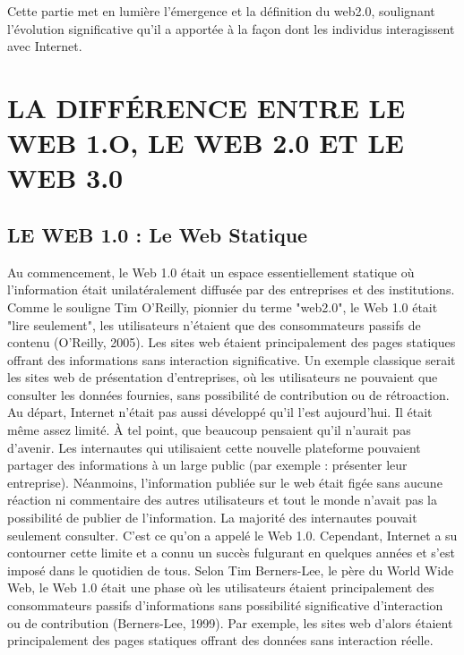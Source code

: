 \documentclass[12pt,a4paper]{article} %
\begin{document}
	Cette partie met en lumière l'émergence et la définition du web2.0, soulignant l'évolution significative qu'il a apportée à la façon dont les individus interagissent avec Internet.
	
	
	\section{\textbf{LA DIFFÉRENCE ENTRE LE WEB 1.O, LE WEB 2.0 ET LE WEB 3.0}}
	\subsection{\textbf{LE WEB 1.0 : Le Web Statique}}
	Au commencement, le Web 1.0 était un espace essentiellement statique où l'information était unilatéralement diffusée par des entreprises et des institutions. Comme le souligne Tim O’Reilly, pionnier du terme "web2.0", le Web 1.0 était "lire seulement", les utilisateurs n'étaient que des consommateurs passifs de contenu (O’Reilly, 2005).  
	Les sites web étaient principalement des pages statiques offrant des informations sans interaction significative. Un exemple classique serait les sites web de présentation d'entreprises, où les utilisateurs ne pouvaient que consulter les données fournies, sans possibilité de contribution ou de rétroaction. Au départ, Internet n’était pas aussi développé qu’il l’est aujourd’hui. Il était même assez limité. À tel point, que beaucoup pensaient qu’il n’aurait pas d’avenir. Les internautes qui utilisaient cette nouvelle plateforme pouvaient partager des informations à un large public (par exemple : présenter leur entreprise). Néanmoins, l’information publiée sur le web était figée sans aucune réaction ni commentaire des autres utilisateurs et tout le monde n’avait pas la possibilité de publier de l’information. La majorité des internautes pouvait seulement consulter. C’est ce qu’on a appelé le Web 1.0. Cependant, Internet a su contourner cette limite et a connu un succès fulgurant en quelques années et s’est imposé dans le quotidien de tous.
	Selon Tim Berners-Lee, le père du World Wide Web, le Web 1.0 était une phase où les utilisateurs étaient principalement des consommateurs passifs d'informations sans possibilité significative d'interaction ou de contribution (Berners-Lee, 1999). Par exemple, les sites web d'alors étaient principalement des pages statiques offrant des données sans interaction réelle.
\end{document}
